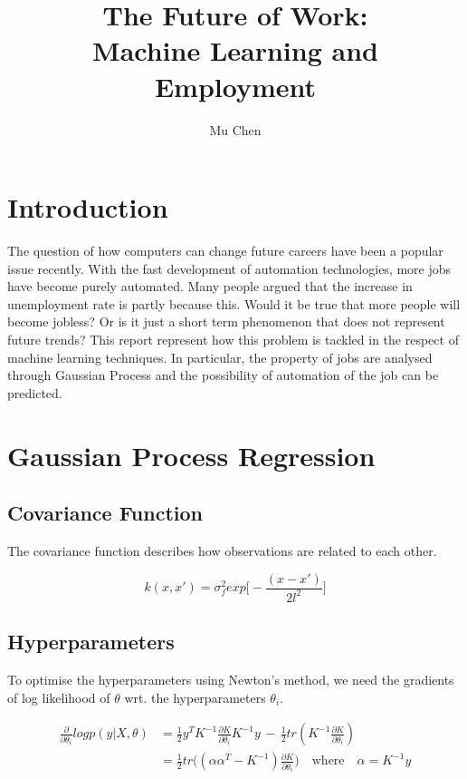 \documentclass[11pt]{report}
\title{The Future of Work: \\ Machine Learning and Employment}
\author{Mu Chen}
\begin{document}
\newpage
\maketitle
 
\lhead{} 
 
\tableofcontents

\begin{spacing}{2}

\newpage
{}
\setcounter{page}{1}


\section{Introduction}
The question of how computers can change future careers have been a popular issue recently. With the fast development of automation technologies, more jobs have become purely automated. Many people argued that the increase in unemployment rate is partly because this. Would it be true that more people will become jobless? Or is it just a short term phenomenon that does not represent future trends? This report represent how this problem is tackled in the respect of machine learning techniques. In particular, the property of jobs are analysed through Gaussian Process and the possibility of automation of the job can be predicted. 

\newpage
{}
\section{Gaussian Process Regression}

\subsection{Covariance Function}
The covariance function describes how observations are related to each other.

\[k(x,x\prime) = \sigma_f^2exp\big[-\frac{(x-x\prime)}{2l^2}\big]\]

\subsection{Hyperparameters}
To optimise the hyperparameters using Newton's method, we need the gradients of log likelihood of $\theta$ wrt. the hyperparameters $\theta_i$.  
 
\begin{equation}
\begin{split}
\frac{\partial}{\partial \theta_i} logp(y|X,\theta) & = \frac{1}{2}y^T K^{-1}\frac{\partial K}{\partial \theta_i}K^{-1}y \, - \, \frac{1}{2}tr(K^{-1}\frac{\partial K}{\partial \theta_i}) \\ & = \frac{1}{2}tr\big( (\alpha\alpha^T - K^{-1})\frac{\partial K}{\partial \theta_i}\big) \quad \mbox{where}\quad\alpha = K^{-1}y
\end{split}
\end{equation}


\end{spacing}
\end{document}

